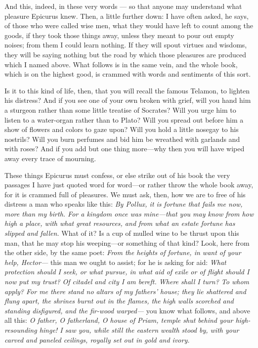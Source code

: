  And this, indeed, in these very words — so that anyone may understand what pleasure Epicurus knew. Then, a little further down: I have often asked, he says, of those who were called wise men, what they would have left to count among the goods, if they took those things away, unless they meant to pour out empty noises; from them I could learn nothing. If they will spout virtues and wisdoms, they will be saying nothing but the road by which those pleasures are produced which I named above. What follows is in the same vein, and the whole book, which is on the highest good, is crammed with words and sentiments of this sort.

 Is it to this kind of life, then, that you will recall the famous Telamon, to lighten his distress? And if you see one of your own broken with grief, will you hand him a sturgeon rather than some little treatise of Socrates? Will you urge him to listen to a water-organ rather than to Plato? Will you spread out before him a show of flowers and colors to gaze upon? Will you hold a little nosegay to his nostrils? Will you burn perfumes and bid him be wreathed with garlands and with roses? And if you add but one thing more—why then you will have wiped away every trace of mourning.

 These things Epicurus must confess, or else strike out of his book the very passages I have just quoted word for word—or rather throw the whole book away, for it is crammed full of pleasures. We must ask, then, how we are to free of his distress a man who speaks like this: \textit{By Pollux, it is fortune that fails me now, more than my birth. For a kingdom once was mine—that you may know from how high a place, with what great resources, and from what an estate fortune has slipped and fallen.} What of it? Is a cup of mulled wine to be thrust upon this man, that he may stop his weeping—or something of that kind? Look, here from the other side, by the same poet: \textit{From the heights of fortune, in want of your help, Hector—} this man we ought to assist; for he is asking for aid: \textit{What protection should I seek, or what pursue, in what aid of exile or of flight should I now put my trust? Of citadel and city I am bereft. Where shall I turn? To whom apply? For me there stand no altars of my fathers' house; they lie shattered and flung apart, the shrines burnt out in the flames, the high walls scorched and standing disfigured, and the fir-wood warped—} you know what follows, and above all this: \textit{O father, O fatherland, O house of Priam, temple shut behind your high-resounding hinge! I saw you, while still the eastern wealth stood by, with your carved and paneled ceilings, royally set out in gold and ivory.}

